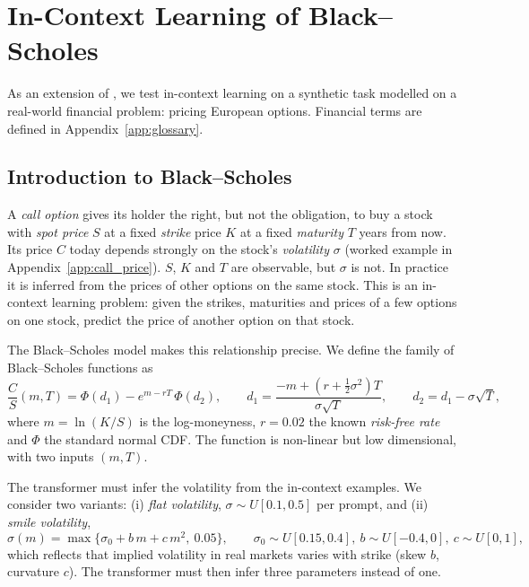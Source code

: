 \vspace{-0.5em}
\section{In-Context Learning of Black--Scholes}
\vspace{-0.5em}

  As an extension of \cite{garg2022what}, we test in-context learning on a synthetic task
  modelled on a real-world financial problem: pricing European options. Financial terms are
  defined in Appendix~\ref{app:glossary}.

\vspace{-0.5em}
  \subsection{Introduction to Black--Scholes}
  \vspace{-0.5em}

  A \emph{call option} gives its holder the right, but not the obligation, to buy a stock
  with \emph{spot price} $S$ at a fixed \emph{strike} price $K$ at a fixed \emph{maturity}
  $T$ years from now. Its price $C$ today depends strongly on the stock's \emph{volatility}
  $\sigma$ (worked example in Appendix~\ref{app:call_price}). $S$, $K$ and $T$ are
  observable, but $\sigma$ is not. In practice it is inferred from the prices of other
  options on the same stock. This is an in-context learning problem:  given the strikes, maturities and prices of a few
  options on one stock, predict the price of another option on that stock.

  The Black--Scholes model makes this relationship precise. We define the family of
  Black--Scholes functions as
  \begin{equation}
    \frac{C}{S}(m, T) = \Phi(d_1) - e^{m - rT}\,\Phi(d_2), \qquad
    d_1 = \frac{-m + \left(r + \tfrac{1}{2}\sigma^2\right)T}{\sigma\sqrt{T}}, \qquad
    d_2 = d_1 - \sigma\sqrt{T},
    \label{bs}
  \end{equation}
  where $m = \ln(K/S)$ is the log-moneyness, $r = 0.02$ the known \emph{risk-free rate} and $\Phi$
  the standard normal CDF. The function is non-linear but low dimensional, with two inputs
  $(m, T)$.

  The transformer must infer the volatility from the in-context examples. We consider two
  variants: (i) \emph{flat volatility}, $\sigma \sim U[0.1, 0.5]$ per prompt, and
  (ii) \emph{smile volatility},
  \begin{equation}
    \sigma(m) = \max\{\sigma_0 + b\,m + c\,m^2,\ 0.05\}, \qquad
    \sigma_0 \sim U[0.15, 0.4],\ b \sim U[-0.4, 0],\ c \sim U[0, 1],
  \end{equation}
  which reflects that implied volatility in real markets varies with strike (skew $b$,
  curvature $c$). The transformer must then infer three parameters instead of one.
  \vspace{-0.5em}

